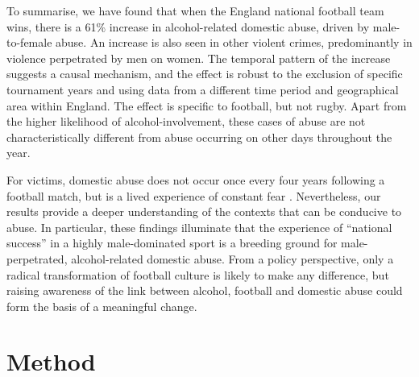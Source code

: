 \documentclass[12pt, letterpaper]{article}
\begin{document}
To summarise, we have found that when the England national football team wins, there is a 61\% increase in alcohol-related domestic abuse, driven by male-to-female abuse. An increase is also seen in other violent crimes, predominantly in violence perpetrated by men on women. The temporal pattern of the increase suggests a causal mechanism, and the effect is robust to the exclusion of specific tournament years and using data from a different time period and geographical area within England. The effect is specific to football, but not rugby. Apart from the higher likelihood of alcohol-involvement, these cases of abuse are not characteristically different from abuse occurring on other days throughout the year. 

For victims, domestic abuse does not occur once every four years following a football match, but is a lived experience of constant fear \autocite{Brooks-Hay2018}. Nevertheless, our results provide a deeper understanding of the contexts that can be conducive to abuse. In particular, these findings illuminate that the experience of ``national success'' in a highly male-dominated sport is a breeding ground for male-perpetrated, alcohol-related domestic abuse. From a policy perspective, only a radical transformation of football culture is likely to make any difference\autocite{Swallow}, but raising awareness of the link between alcohol, football and domestic abuse could form the basis of a meaningful change. 

\newpage

\section*{Method}
\end{document}
